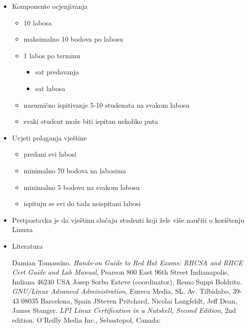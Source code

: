 \documentclass[croatian,t]{beamer} %
\begin{document}
	\begin{frame}
		\begin{itemize}
    		\item Komponente ocjenjivanja
    	 	\begin{itemize}
    	 		\item 10 labosa
    	 		\item maksimalno 10 bodova po labosu
    	 		\item 1 labos po terminu
    	 		\begin{itemize}
    	 			\item sat predavanja
    	 			\item sat labosa
    	 		\end{itemize}
    	 		\item nasumično ispitivanje 5-10 studenata na svakom labosu
    	 		\item svaki student može biti ispitan nekoliko puta
    	 	\end{itemize}
    	 	\item Uvjeti polaganja vještine
    	 	\begin{itemize}
    	 		 \item predani svi labosi
    	 		 \item minimalno 70 bodova na labosima
    	 		 \item minimalno 5 bodova na svakom labosu
    	 		 \item ispituju se svi do tada neispitani labosi
    	 	\end{itemize}
    	\item Pretpostavka je da vještinu slučaju studenti koji žele više naučiti o korištenju Linuxa
    	\end{itemize}
	\end{frame}

	\begin{frame}
		\begin{itemize}
			\item Literatura
			\begin{thebibliography}{9}
  					Damian Tomassino.
  					\emph{Hands-on Guide to Red Hat Exams: RHCSA and RHCE Cert Guide and Lab Manual},
					Pearson
					800 East 96th Street
					Indianapolis, Indiana 46240 USA
  					Josep Sorba Esteve (coordinator), Remo Suppi Boldrito.
  					\emph{GNU/Linux Advanced Administration},
					Eureca Media, SL.
					Av. Tilbidabo, 39-43
					08035 Barcelona, Spain
  					JSteven Pritchard, Nicolai Langfeldt, Jeff Dean, James Stanger.
  					\emph{LPI Linux Certification in a Nutshell, Second Edition},
					2nd edition.
					O’Reilly Media Inc.,
  					Sebastopol, Canada:
  			\end{thebibliography}
		\end{itemize}
	\end{frame}
\end{document}
